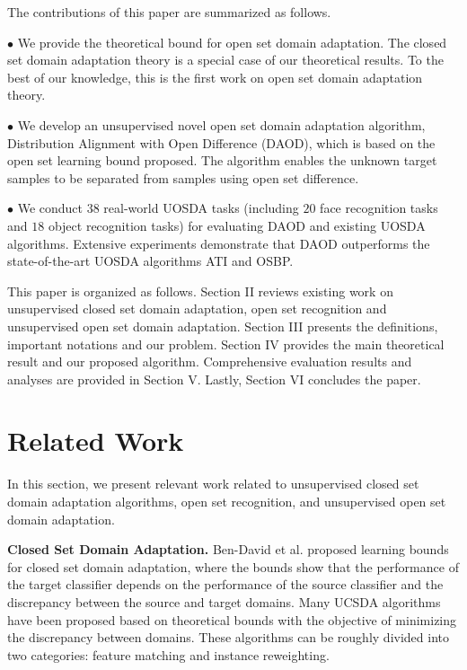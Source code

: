 \documentclass[journal]{IEEEtran}
\begin{document}
The contributions of this paper are summarized as
follows.

$\bullet$  We provide the theoretical bound  for open set domain adaptation. The closed set domain adaptation theory \cite{DBLP:conf/nips/Ben-DavidBCP06} is a special case of our theoretical results. To the best of our
knowledge, this is the first work on open set domain adaptation theory. 



$\bullet$ We develop an unsupervised novel open set domain adaptation algorithm, Distribution Alignment with Open Difference (DAOD), which is based on the open set learning bound proposed.  The algorithm enables  the unknown target samples to be separated from samples using open set difference. 

$\bullet$  We conduct $38$ real-world UOSDA tasks (including $20$ face recognition tasks and $18$ object recognition tasks) for evaluating DAOD and existing UOSDA algorithms. Extensive experiments demonstrate that DAOD outperforms the state-of-the-art UOSDA algorithms ATI and OSBP.  

This paper is organized as follows. Section II reviews existing work on unsupervised closed set domain adaptation, open set recognition and unsupervised open set domain adaptation. Section III presents the definitions, important notations and our problem. Section IV provides the main theoretical result and our proposed algorithm. Comprehensive evaluation results and analyses are provided in Section V. Lastly, Section VI concludes the paper. 



\section{Related Work}
In this section, we present relevant work related to unsupervised closed set domain adaptation algorithms, open set recognition, and unsupervised open set domain adaptation.

\textbf{Closed Set Domain Adaptation.} Ben-David et al.\cite{DBLP:conf/nips/Ben-DavidBCP06} proposed learning bounds for closed set domain adaptation, where the bounds show that the performance of the target classifier depends on the performance of the source classifier and the discrepancy between the source and target domains. Many UCSDA algorithms \cite{long2014transfer,DBLP:journals/tnn/LiSH17,DBLP:journals/tnn/DengLOTCZ19,liu2019butterfly} have been proposed based on theoretical bounds with the objective of minimizing the discrepancy between domains. These algorithms can be roughly divided into two categories: feature matching and instance reweighting.
\end{document}
